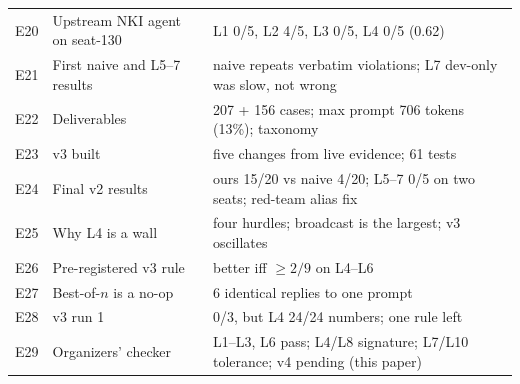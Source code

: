 \documentclass[11pt]{article}
\begin{document}
{\begin{tabularx}{\linewidth}{@{}l>{\raggedright\arraybackslash}p{5.0cm}Y@{}}
E20 & Upstream NKI agent on seat-130 & L1 0/5, L2 4/5, L3 0/5, L4 0/5 (0.62) \\
E21 & First naive and L5--7 results & naive repeats verbatim violations; L7 dev-only was slow, not wrong \\
E22 & Deliverables & 207 + 156 cases; max prompt 706 tokens (13\%); taxonomy \\
E23 & v3 built & five changes from live evidence; 61 tests \\
E24 & Final v2 results & ours 15/20 vs naive 4/20; L5--7 0/5 on two seats; red-team alias fix \\
E25 & Why L4 is a wall & four hurdles; broadcast is the largest; v3 oscillates \\
E26 & Pre-registered v3 rule & better iff $\ge2/9$ on L4--L6 \\
E27 & Best-of-$n$ is a no-op & 6 identical replies to one prompt \\
E28 & v3 run 1 & 0/3, but L4 24/24 numbers; one rule left \\
E29 & Organizers' checker & L1--L3, L6 pass; L4/L8 signature; L7/L10 tolerance; v4 pending (this paper) \\
\bottomrule
\end{tabularx}}
\end{document}
